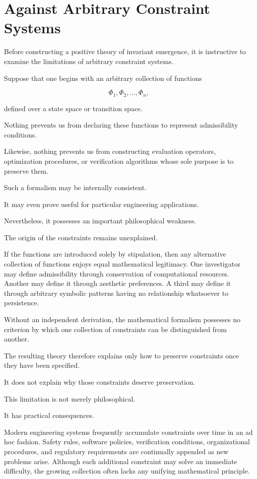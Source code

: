 \documentclass[11pt]{book}
\numberwithin{equation}{chapter}
\theoremstyle{definition}
\theoremstyle{plain}
\begin{document}
\section{Against Arbitrary Constraint Systems}

Before constructing a positive theory of invariant emergence, it is instructive to examine the limitations of arbitrary constraint systems.

Suppose that one begins with an arbitrary collection of functions

\[
\Phi_1,\Phi_2,\ldots,\Phi_n,
\]

defined over a state space or transition space.

Nothing prevents us from declaring these functions to represent admissibility conditions.

Likewise, nothing prevents us from constructing evaluation operators, optimization procedures, or verification algorithms whose sole purpose is to preserve them.

Such a formalism may be internally consistent.

It may even prove useful for particular engineering applications.

Nevertheless, it possesses an important philosophical weakness.

The origin of the constraints remains unexplained.

If the functions are introduced solely by stipulation, then any alternative collection of functions enjoys equal mathematical legitimacy. One investigator may define admissibility through conservation of computational resources. Another may define it through aesthetic preferences. A third may define it through arbitrary symbolic patterns having no relationship whatsoever to persistence.

Without an independent derivation, the mathematical formalism possesses no criterion by which one collection of constraints can be distinguished from another.

The resulting theory therefore explains only how to preserve constraints once they have been specified.

It does not explain why those constraints deserve preservation.

This limitation is not merely philosophical.

It has practical consequences.

Modern engineering systems frequently accumulate constraints over time in an ad hoc fashion. Safety rules, software policies, verification conditions, organizational procedures, and regulatory requirements are continually appended as new problems arise. Although each additional constraint may solve an immediate difficulty, the growing collection often lacks any unifying mathematical principle.
\end{document}
